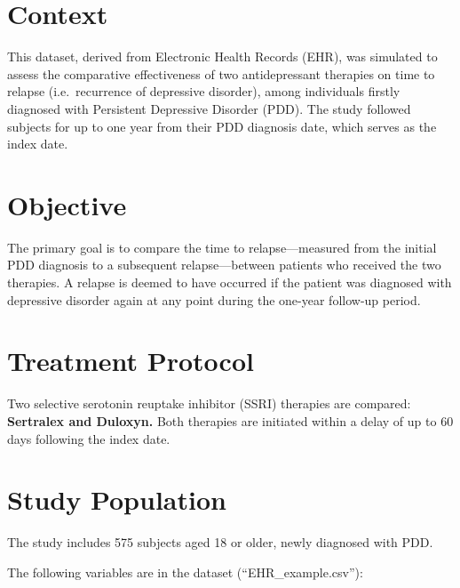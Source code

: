 \documentclass[
]{book}
\begin{document}
\section{Context}\label{context}

This dataset, derived from Electronic Health Records (EHR), was simulated to assess the comparative effectiveness of two antidepressant therapies on time to relapse (i.e.~recurrence of depressive disorder), among individuals firstly diagnosed with Persistent Depressive Disorder (PDD). The study followed subjects for up to one year from their PDD diagnosis date, which serves as the index date.

\section{Objective}\label{objective}

The primary goal is to compare the time to relapse---measured from the initial PDD diagnosis to a subsequent relapse---between patients who received the two therapies. A relapse is deemed to have occurred if the patient was diagnosed with depressive disorder again at any point during the one-year follow-up period.

\section{Treatment Protocol}\label{treatment-protocol}

Two selective serotonin reuptake inhibitor (SSRI) therapies are compared: \textbf{Sertralex and Duloxyn.} Both therapies are initiated within a delay of up to 60 days following the index date.

\section{Study Population}\label{study-population}

The study includes 575 subjects aged 18 or older, newly diagnosed with PDD.

The following variables are in the dataset (``EHR\_example.csv''):
\end{document}

